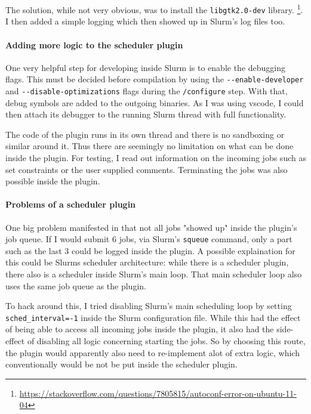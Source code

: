 The solution, while not very obvious, was to install the \verb|libgtk2.0-dev| library. \footnote{\url{https://stackoverflow.com/questions/7805815/autoconf-error-on-ubuntu-11-04}}. 
I then added a simple logging which then showed up in Slurm's log files too.

\paragraph{Adding more logic to the scheduler plugin}

One very helpful step for developing inside Slurm is to enable the debugging flags.
This must be decided before compilation by using the \verb|--enable-developer| and \verb|--disable-optimizations| flags during the \verb|/configure| step. 
With that, debug symbols are added to the outgoing binaries. 
As I was using vscode, I could then attach its debugger to the running Slurm thread with full functionality.

The code of the plugin runs in its own thread and there is no sandboxing or similar around it.
Thus there are seemingly no limitation on what can be done inside the plugin. 
For testing, I read out information on the incoming jobs such as set constraints or the user supplied comments. Terminating the jobs was also possible inside the plugin.

\paragraph{Problems of a scheduler plugin}

One big problem manifested in that not all jobs "showed up" inside the plugin's job queue. 
If I would submit 6 jobs, via Slurm's \verb|squeue| command, only a part such as the last 3 could be logged inside the plugin.
A possible explaination for this could be Slurms scheduler architecture: while there is a scheduler plugin, there also is a scheduler inside Slurm's main loop. 
That main scheduler loop also uses the same job queue as the plugin.

To hack around this, I tried disabling Slurm's main scheduling loop by setting \verb|sched_interval=-1| inside the Slurm configuration file. 
While this had the effect of being able to access all incoming jobs inside the plugin, it also had the side-effect of disabling all logic concerning starting the jobs.
So by choosing this route, the plugin would apparently also need to re-implement alot of extra logic, which conventionally would be not be put inside the scheduler plugin. 

